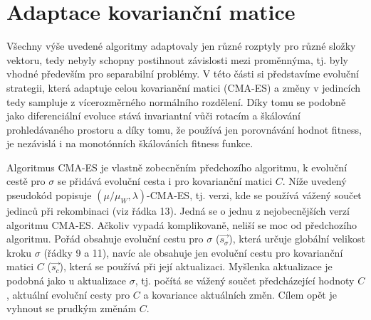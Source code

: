 \section{Adaptace kovarianční matice}

Všechny výše uvedené algoritmy adaptovaly jen různé rozptyly pro různé složky vektoru, tedy nebyly schopny postihnout závislosti mezi proměnnýma, tj. byly vhodné především pro separabilní problémy. V této části si představíme evoluční strategii, která adaptuje celou kovarianční matici (CMA-ES) a změny v jedincích tedy sampluje z vícerozměrného normálního rozdělení. Díky tomu se podobně jako diferenciální evoluce stává invariantní vůči rotacím a škálování prohledávaného prostoru a díky tomu, že používá jen porovnávání hodnot fitness, je nezávislá i na monotónních škálováních fitness funkce.

Algoritmus CMA-ES\cite{Hansen:2001:CDS:1108839.1108843} je vlastně zobecněním předchozího algoritmu, k evoluční cestě pro $\sigma$ se přidává evoluční cesta i pro kovarianční matici $C$. Níže uvedený pseudokód popisuje $(\mu/\mu_W,\lambda)$-CMA-ES, tj. verzi, kde se používá vážený součet jedinců při rekombinaci (viz řádka 13). Jedná se o jednu z nejobecnějších verzí algoritmu CMA-ES. Ačkoliv vypadá komplikovaně, neliší se moc od předchozího algoritmu. Pořád obsahuje evoluční cestu pro $\sigma$ ($\vec{s_\sigma}$), která určuje globální velikost kroku $\sigma$ (řádky 9 a 11), navíc ale obsahuje jen evoluční cestu pro kovarianční matici $C$ ($\vec{s_c}$), která se používá při její aktualizaci. Myšlenka aktualizace je podobná jako u aktualizace $\sigma$, tj. počítá se vážený součet předcházející hodnoty $C$, aktuální evoluční cesty pro $C$ a kovariance aktuálních změn. Cílem opět je vyhnout se prudkým změnám $C$. 

